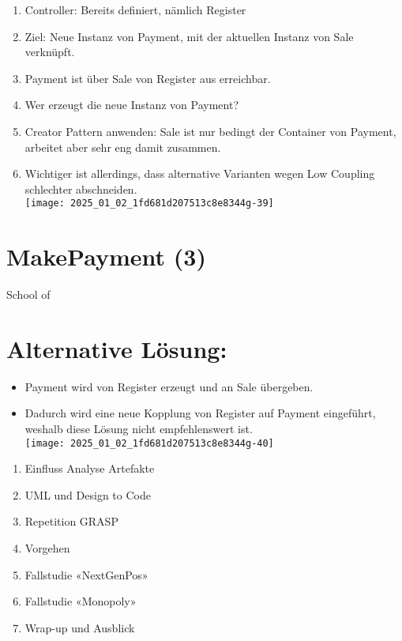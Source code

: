 \documentclass[10pt]{article}
\begin{document}
\begin{enumerate}
  \item Controller: Bereits definiert, nämlich Register
  \item Ziel: Neue Instanz von Payment, mit der aktuellen Instanz von Sale verknüpft.
  \item Payment ist über Sale von Register aus erreichbar.
  \item Wer erzeugt die neue Instanz von Payment?
  \item Creator Pattern anwenden: Sale ist nur bedingt der Container von Payment, arbeitet aber sehr eng damit zusammen.
  \item Wichtiger ist allerdings, dass alternative Varianten wegen Low Coupling schlechter abschneiden.\\
\texttt{[image: 2025\_01\_02\_1fd681d207513c8e8344g-39]}
\end{enumerate}

\section*{MakePayment (3)}
School of

\section*{Alternative Lösung:}
\begin{itemize}
  \item Payment wird von Register erzeugt und an Sale übergeben.
  \item Dadurch wird eine neue Kopplung von Register auf Payment eingeführt, weshalb diese Lösung nicht empfehlenswert ist.\\
\texttt{[image: 2025\_01\_02\_1fd681d207513c8e8344g-40]}
\end{itemize}

\begin{enumerate}
  \item Einfluss Analyse Artefakte
  \item UML und Design to Code
  \item Repetition GRASP
  \item Vorgehen
  \item Fallstudie «NextGenPos»
  \item Fallstudie «Monopoly»
  \item Wrap-up und Ausblick
\end{enumerate}
\end{document}
